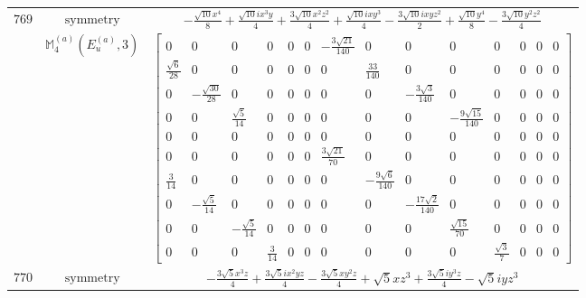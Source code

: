 \documentclass[fleqn,8pt,landscape]{jsarticle}
\begin{document}
\begin{longtable}{ccc}
$ 769 $ & $ \text{symmetry} $ & $ - \frac{\sqrt{10} x^{4}}{8} + \frac{\sqrt{10} i x^{3} y}{4} + \frac{3 \sqrt{10} x^{2} z^{2}}{4} + \frac{\sqrt{10} i x y^{3}}{4} - \frac{3 \sqrt{10} i x y z^{2}}{2} + \frac{\sqrt{10} y^{4}}{8} - \frac{3 \sqrt{10} y^{2} z^{2}}{4} $ \\
$  $ & $ \mathbb{M}_{4}^{(a)}(E_{u}^{(a)},3) $ & $ \begin{bmatrix} 0 & 0 & 0 & 0 & 0 & 0 & - \frac{3 \sqrt{21}}{140} & 0 & 0 & 0 & 0 & 0 & 0 & 0 \\ \frac{\sqrt{6}}{28} & 0 & 0 & 0 & 0 & 0 & 0 & \frac{33}{140} & 0 & 0 & 0 & 0 & 0 & 0 \\ 0 & - \frac{\sqrt{30}}{28} & 0 & 0 & 0 & 0 & 0 & 0 & - \frac{3 \sqrt{3}}{140} & 0 & 0 & 0 & 0 & 0 \\ 0 & 0 & \frac{\sqrt{5}}{14} & 0 & 0 & 0 & 0 & 0 & 0 & - \frac{9 \sqrt{15}}{140} & 0 & 0 & 0 & 0 \\ 0 & 0 & 0 & 0 & 0 & 0 & 0 & 0 & 0 & 0 & 0 & 0 & 0 & 0 \\ 0 & 0 & 0 & 0 & 0 & 0 & \frac{3 \sqrt{21}}{70} & 0 & 0 & 0 & 0 & 0 & 0 & 0 \\ \frac{3}{14} & 0 & 0 & 0 & 0 & 0 & 0 & - \frac{9 \sqrt{6}}{140} & 0 & 0 & 0 & 0 & 0 & 0 \\ 0 & - \frac{\sqrt{5}}{14} & 0 & 0 & 0 & 0 & 0 & 0 & - \frac{17 \sqrt{2}}{140} & 0 & 0 & 0 & 0 & 0 \\ 0 & 0 & - \frac{\sqrt{5}}{14} & 0 & 0 & 0 & 0 & 0 & 0 & \frac{\sqrt{15}}{70} & 0 & 0 & 0 & 0 \\ 0 & 0 & 0 & \frac{3}{14} & 0 & 0 & 0 & 0 & 0 & 0 & \frac{\sqrt{3}}{7} & 0 & 0 & 0 \end{bmatrix} $ \\ \hline
$ 770 $ & $ \text{symmetry} $ & $ - \frac{3 \sqrt{5} x^{3} z}{4} + \frac{3 \sqrt{5} i x^{2} y z}{4} - \frac{3 \sqrt{5} x y^{2} z}{4} + \sqrt{5} x z^{3} + \frac{3 \sqrt{5} i y^{3} z}{4} - \sqrt{5} i y z^{3} $ \\

\end{longtable}
\end{document}
